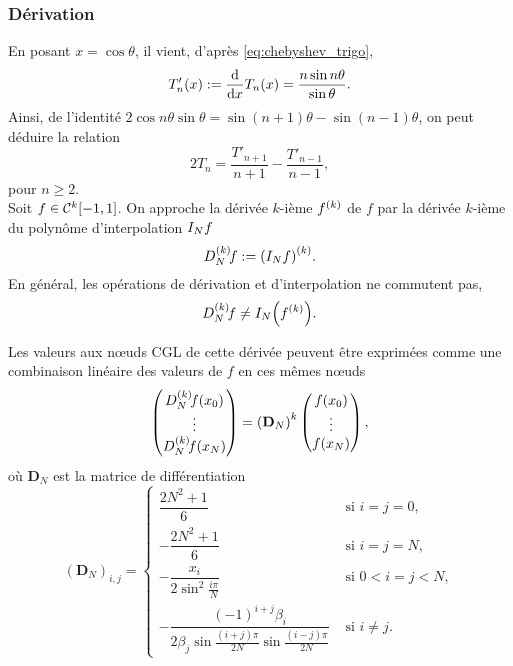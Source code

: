 \subsubsection{Dérivation}
En posant $x = \cos\theta$, il vient, d'après \eqref{eq:chebyshev_trigo},
\begin{equation}
	T_n'(x) := \dfdx{T_n(x)}{x} = \frac{n \sin n\theta}{\sin \theta}.
\end{equation}
Ainsi, de l'identité $2 \cos n \theta \sin \theta = \sin(n+1)\theta - \sin(n-1)\theta$, on peut déduire la relation 
\begin{equation}
	2 T_n = \frac{T'_{n+1}}{n+1} - \frac{T'_{n-1}}{n-1} ,
	\label{eq:chebyshev_relation_deriv_3termes}
\end{equation}
pour $n \geq 2$.
\\
Soit $f \in \contdiff{k}\chebinterval$.
On approche la dérivée $k$-ième $\deriv{f}{k}$ de $f$ par la dérivée $k$-ième du polynôme d'interpolation $\interpolant{f}{N}$
\begin{equation}
	\interpderiv{f}{N}{k} := \deriv{ \left( \interpolant{f}{N} \right) }{k}.
	\label{eq:chebyshev_def_interpderiv}
\end{equation}
En général, les opérations de dérivation et d'interpolation ne commutent pas, \ie
\begin{equation}
	\interpderiv{f}{N}{k} \neq \interpolant{ \left( \deriv{f}{k} \right) }{N}.
\end{equation}

Les valeurs aux n\oe uds CGL de cette dérivée peuvent être exprimées comme une combinaison linéaire des valeurs de $f$ en ces mêmes n\oe uds
\begin{equation}
	\colvec{ 
		\interpderiv{f}{N}{k}(x_0) \\ 
		\vdots \\
		\interpderiv{f}{N}{k}(x_N)
		}
	=
	{\left( \mathbf{D}_N \right)}^k
	\colvec{ 
		f(x_0) \\ 
		\vdots \\
		f(x_N)
		},
	\label{eq:chebyshev_diff_at_cgl}
\end{equation}
où $\mathbf{D}_N$ est la matrice de différentiation \cite{canuto2006}
\def\cvsp{2.5ex}
\begin{equation}
	\left( \mathbf{D}_N \right)_{i,j} =
	\begin{cases}
	 \dfrac{2N^2 + 1}{6} & \text{\ si\ } i = j = 0,   \\[\cvsp]
	 -\dfrac{2N^2 + 1}{6} & \text{\ si\ } i = j = N,   \\[\cvsp]
	 -\dfrac{x_i}{2 \sin^2 \frac{i \pi}{N}} & \text{\ si\ } 0 < i = j < N, \\[\cvsp]
	 -\dfrac{(-1)^{i+j} \beta_i}{2 \beta_j \sin\frac{(i+j)\pi}{2N} \sin\frac{(i-j)\pi}{2N}} & \text{\ si\ } i \neq j.
	\end{cases}
	\label{eq:chebyshev_diff_matrix}
\end{equation}

